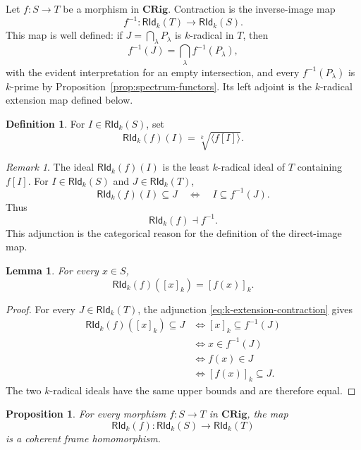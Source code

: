 \documentclass[12pt,leqno]{amsart}
\newcommand{\CRig}{\mathbf{CRig}}
\newcommand{\RIdk}{\mathsf{RId}_{k}}
\newtheorem{proposition}[theorem]{Proposition}
\newtheorem{lemma}[theorem]{Lemma}
\theoremstyle{definition}
\newtheorem{definition}{Definition}[section]
\numberwithin{equation}{section}
\theoremstyle{remark}
\newtheorem{remark}[theorem]{Remark}
\begin{document}
Let \(f\colon S\to T\) be a morphism in \(\CRig\). Contraction is the inverse-image map
\[
f^{-1}\colon\RIdk(T)\longrightarrow\RIdk(S).
\]
This map is well defined: if \(J=\bigcap_{\lambda}P_\lambda\) is $k$-radical in $T$, then
\[
f^{-1}(J)=\bigcap_{\lambda}f^{-1}(P_\lambda),
\]
with the evident interpretation for an empty intersection, and every \(f^{-1}(P_\lambda)\) is $k$-prime by Proposition~\ref{prop:spectrum-functors}. Its left adjoint is the $k$-radical extension map defined below.

\begin{definition}
For \(I\in\RIdk(S)\), set
\[
\RIdk(f)(I)=\sqrt[k]{\langle f[I]\rangle}.
\]
\end{definition}

\begin{remark}\label{rem:k-extension-contraction}
The ideal \(\RIdk(f)(I)\) is the least $k$-radical ideal of $T$ containing \(f[I]\). For \(I\in\RIdk(S)\) and \(J\in\RIdk(T)\),
\begin{equation}\label{eq:k-extension-contraction}
\RIdk(f)(I)\subseteq J
\quad\Longleftrightarrow\quad
I\subseteq f^{-1}(J).
\end{equation}
Thus
\[
\RIdk(f)\dashv f^{-1}.
\]
This adjunction is the categorical reason for the definition of the direct-image map.
\end{remark}

\begin{lemma}\label{lem:k-extension-principal}
For every \(x\in S\),
\[
\RIdk(f)([x]_k)=[f(x)]_k.
\]
\end{lemma}

\begin{proof}
For every \(J\in\RIdk(T)\), the adjunction \eqref{eq:k-extension-contraction} gives
\begin{align*}
\RIdk(f)([x]_k)\subseteq J
&\Longleftrightarrow [x]_k\subseteq f^{-1}(J)\\
&\Longleftrightarrow x\in f^{-1}(J)\\
&\Longleftrightarrow f(x)\in J\\
&\Longleftrightarrow [f(x)]_k\subseteq J.
\end{align*}
The two $k$-radical ideals have the same upper bounds and are therefore equal.
\end{proof}

\begin{proposition}\label{prop:k-extension-coherent}
For every morphism \(f\colon S\to T\) in \(\CRig\), the map
\[
\RIdk(f)\colon\RIdk(S)\longrightarrow\RIdk(T)
\]
is a coherent frame homomorphism.
\end{proposition}
\end{document}
